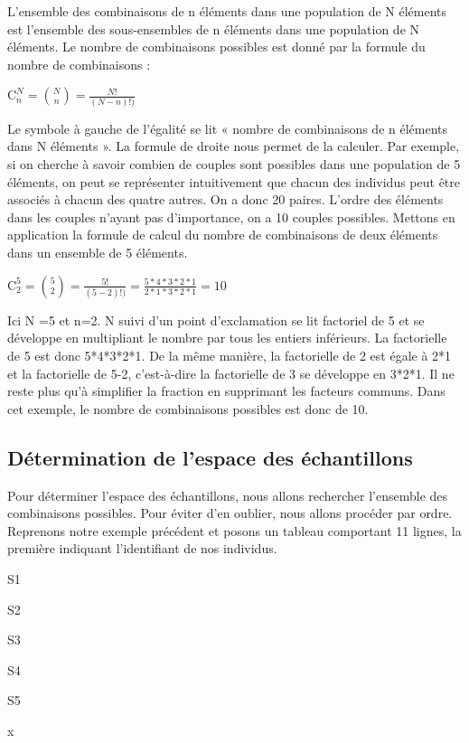 \documentclass[]{book}
\theoremstyle{definition}
\theoremstyle{definition}
\theoremstyle{definition}
\theoremstyle{remark}
\begin{document}
L'ensemble des combinaisons de n éléments dans une population de N
éléments est l'ensemble des sous-ensembles de n éléments dans une
population de N éléments. Le nombre de combinaisons possibles est donné
par la formule du nombre de combinaisons :

\(\textrm{C}_{n}^{N} = \binom{N}{n} = \frac{N!}{(N-n)!)}\)

Le symbole à gauche de l'égalité se lit « nombre de combinaisons de n
éléments dans N éléments ». La formule de droite nous permet de la
calculer. Par exemple, si on cherche à savoir combien de couples sont
possibles dans une population de 5 éléments, on peut se représenter
intuitivement que chacun des individus peut être associés à chacun des
quatre autres. On a donc 20 paires. L'ordre des éléments dans les
couples n'ayant pas d'importance, on a 10 couples possibles. Mettons en
application la formule de calcul du nombre de combinaisons de deux
éléments dans un ensemble de 5 éléments.

\(\textrm{C}_{2}^{5} = \binom{5}{2} = \frac{5!}{(5-2)!)} = \frac{5*4*3*2*1}{2*1*3*2*1} = 10\)

Ici N =5 et n=2. N suivi d'un point d'exclamation se lit factoriel de 5
et se développe en multipliant le nombre par tous les entiers
inférieurs. La factorielle de 5 est donc 5*4*3*2*1. De la même manière,
la factorielle de 2 est égale à 2*1 et la factorielle de 5-2,
c'est-à-dire la factorielle de 3 se développe en 3*2*1. Il ne reste plus
qu'à simplifier la fraction en supprimant les facteurs communs. Dans cet
exemple, le nombre de combinaisons possibles est donc de 10.

\hypertarget{determination-de-lespace-des-echantillons}{%
\subsection{Détermination de l'espace des
échantillons}\label{determination-de-lespace-des-echantillons}}

Pour déterminer l'espace des échantillons, nous allons rechercher
l'ensemble des combinaisons possibles. Pour éviter d'en oublier, nous
allons procéder par ordre. Reprenons notre exemple précédent et posons
un tableau comportant 11 lignes, la première indiquant l'identifiant de
nos individus.

S1

S2

S3

S4

S5

x
\end{document}

